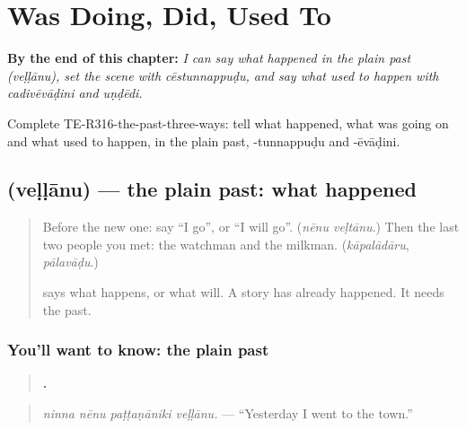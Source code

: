 
\chapter{Was Doing, Did, Used To}
\label{ch:te-was-doing-did-used-to}

\begin{chapteropening}
\textbf{By the end of this chapter:} \emph{I can say what happened in the plain past (veḷḷānu), set the scene with cēstunnappuḍu, and say what used to happen with cadivēvāḍini and uṇḍēdi.}

Complete TE-R316-the-past-three-ways: tell what happened, what was going on and what used to happen, in the plain past, -tunnappuḍu and -ēvāḍini.
\end{chapteropening}

\section[\texorpdfstring{\te{వెళ్ళాను} (veḷḷānu)}{వెళ్ళాను (veḷḷānu)}]{ (veḷḷānu) — the plain past: what happened}

\label{lesson:TE-C316-vellanu}



\begin{quote}
Before the new one: say \textquotedblleft{}I go\textquotedblright{}, or \textquotedblleft{}I will go\textquotedblright{}. (\emph{nēnu veḷtānu}.) Then the last two people you met: the watchman and the milkman. (\emph{kāpalādāru}, \emph{pālavāḍu}.)

\textbf{} says what happens, or what will. A story has already happened. It needs the past.
\end{quote}

\subsection*{You'll want to know: the plain past}
\begin{quote}
\textbf{   .}
\end{quote}

\begin{quote}
\emph{ninna nēnu paṭṭaṇāniki veḷḷānu.} — \textquotedblleft{}Yesterday I went to the town.\textquotedblright{}
\end{quote}


